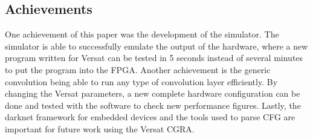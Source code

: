 \documentclass[conference]{IEEEtran}
\begin{document}
\subsection{Achievements}
\label{section:achievements}

One achievement of this paper was the development of the simulator. The simulator is able
to successfully emulate the output of the hardware, where a new program written for Versat
can be tested in 5 seconds instead of several minutes to put the program into the FPGA.
Another achievement is the generic convolution being able to run any type of convolution layer
efficiently. By changing the Versat parameters, a new complete hardware configuration can be
done and tested with the software to check new performance figures.
Lastly, the darknet framework for embedded devices and the tools used to parse CFG
are important for future work using the Versat CGRA.







	
	
	
\end{document}
